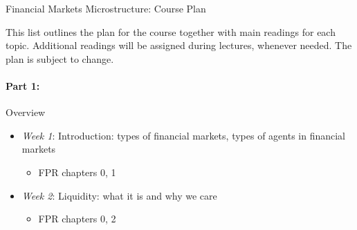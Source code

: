 \documentclass{article}
\begin{document}
\begin{center}
	{\huge Financial Markets Microstructure: Course Plan}
\end{center}
\bigskip

This list outlines the plan for the course together with main readings for each topic. Additional readings will be assigned during lectures, whenever needed. The plan is subject to change.
\medskip

\paragraph{Part 1:} Overview
\begin{itemize}
	\item \textit{Week 1}: Introduction: types of financial markets, types of agents in financial markets
	\begin{itemize}
		\item FPR chapters 0, 1
	\end{itemize}
	\item \textit{Week 2}: Liquidity: what it is and why we care
	\begin{itemize}
		\item FPR chapters 0, 2
	\end{itemize}
\end{itemize}

\medskip 
\end{document}
